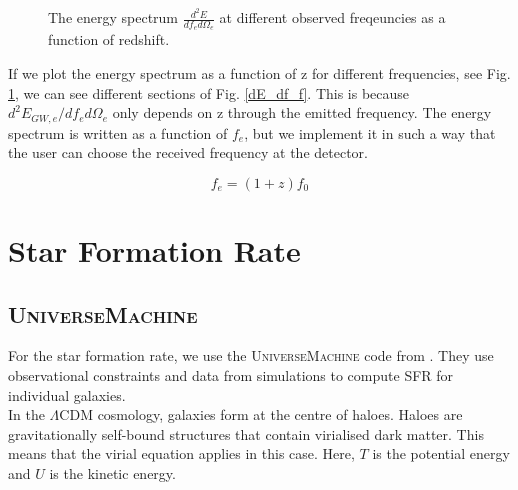 \begin{figure}
  
    \caption{The energy spectrum $\frac{d^2E}{df_e d\Omega_e}$ at different observed freqeuncies as a function of redshift.}
    \label{dE_df_diff_frequencies}
\end{figure}

If we plot the energy spectrum as a function of z for different frequencies, see Fig. \ref{dE_df_diff_frequencies}, we can see different sections of Fig. \ref{dE_df_f}. This is because $d^2 E_{GW,e}/df_e d\Omega_e$ only depends on z through the emitted frequency. The energy spectrum is written as a function of $f_e$, but we implement it in such a way that the user can choose the received frequency at the detector.


\begin{equation}
    f_e = (1+z)f_0
\end{equation}

\section{Star Formation Rate}
\subsection{\textsc{UniverseMachine}}

For the star formation rate, we use the \textsc{UniverseMachine} code from \cite{behroozi_universemachine_2019}. They use observational constraints and data from simulations to compute SFR for individual galaxies. \\

In the $\Lambda$CDM cosmology, galaxies form at the centre of haloes. Haloes are gravitationally self-bound structures that contain virialised dark matter. This means that the virial equation applies in this case. Here, $T$ is the potential energy and $U$ is the kinetic energy.

